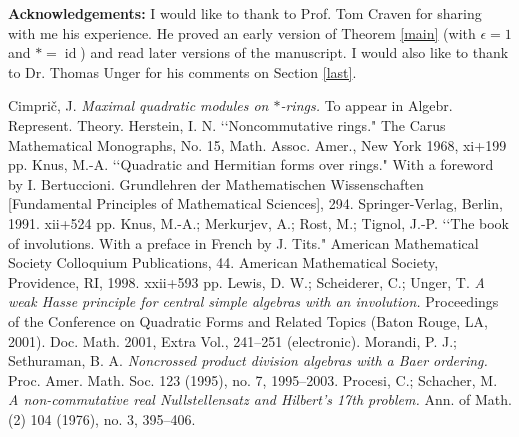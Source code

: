 \documentclass[12pt,reqno]{amsart}
\theoremstyle{definition}
\providecommand{\eps}{\epsilon}
\DeclareMathOperator{\id}{id}
\begin{document}
\vskip 5mm

\textbf{Acknowledgements: } I would like to thank to Prof. Tom Craven for sharing with me his experience.
He proved an early version of Theorem \ref{main} (with $\eps=1$ and $\ast=\id$) and read later versions
of the manuscript. I would also like to thank to Dr. Thomas Unger for his comments on Section \ref{last}.


\begin{thebibliography}{99}
 Cimpri\v c, J.
\textit{Maximal quadratic modules on $\ast$-rings.}
To appear in Algebr. Represent. Theory.
 Herstein, I. N. 
\lq\lq Noncommutative rings."
The Carus Mathematical Monographs, No. 15,
Math. Assoc. Amer., New York 1968, xi+199 pp. 
 Knus, M.-A.
\lq\lq Quadratic and Hermitian forms over rings."
With a foreword by I. Bertuccioni. Grundlehren der Mathematischen Wissenschaften 
[Fundamental Principles of Mathematical Sciences], 294. Springer-Verlag, Berlin, 1991. 
xii+524 pp. 
  Knus, M.-A.; Merkurjev, A.; Rost, M.; Tignol, J.-P.
\lq\lq The book of involutions. With a preface in French by J. Tits."
American Mathematical Society Colloquium Publications, 44. 
American Mathematical Society, Providence, RI, 1998. xxii+593 pp. 
Lewis, D. W.; Scheiderer, C.; Unger, T.
\textit{A weak Hasse principle for central simple algebras with an involution.}
Proceedings of the Conference on Quadratic Forms and Related Topics (Baton Rouge, LA, 2001).
Doc. Math. 2001, Extra Vol., 241--251 (electronic).
 Morandi, P. J.; Sethuraman, B. A. 
\textit{Noncrossed product division algebras with a Baer ordering.}
Proc. Amer. Math. Soc.  123  (1995),  no. 7, 1995--2003. 
 Procesi, C.; Schacher, M.
\textit{A non-commutative real Nullstellensatz and Hilbert's 17th problem.}
Ann. of Math. (2)  104  (1976), no. 3, 395--406.
\end{thebibliography}
\end{document}
